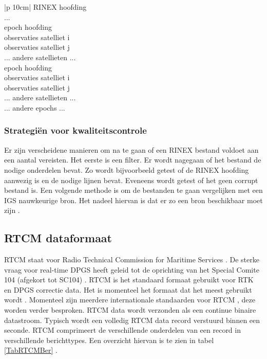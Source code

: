 \newcommand*{\MyIndent}{\hspace*{0.5cm}}%
 \begin{table}[hbp]
 	\caption{Vereenvoudigde samenstelling van een RINEX bestand}
 	\centering		
 	\begin{tabular}{|p {10cm}|}	
 		\hline
 		RINEX hoofding \\
 		... \\ \hline
 		epoch hoofding\\ \hline
 		\MyIndent observaties satelliet i \\ \hline
 		\MyIndent observaties satelliet j \\ \hline
 		... andere satellieten ... \\ \hline
 		epoch hoofding\\ \hline
 		\MyIndent observaties satelliet i \\ \hline
 		\MyIndent observaties satelliet j \\ \hline
 		... andere satellieten ... \\ \hline
 		... andere epochs ... \\ \hline	
 	\end{tabular}
 	\label{TabRINEX}
 \end{table}
 
 
\subsubsection{Strategi\"en voor kwaliteitscontrole}
Er zijn verscheidene manieren om na te gaan of een RINEX bestand voldoet aan een aantal vereisten. Het eerste is een filter. Er wordt nagegaan of het bestand de nodige onderdelen bevat. Zo wordt bijvoorbeeld getest of de RINEX hoofding aanwezig is en de nodige lijnen bevat. Eveneens wordt getest of het geen corrupt bestand is. Een volgende methode is om de bestanden te gaan vergelijken met een IGS nauwkeurige bron. Het nadeel hiervan is dat er zo een bron beschikbaar moet zijn \cite{LBibRINEX3}. 

\subsection{RTCM dataformaat}
\label{LRTC}
RTCM staat voor Radio Technical Commission for Maritime Services \cite{LBibGLONASS}. De sterke vraag voor real-time DPGS heeft geleid tot de oprichting van het Special Comite 104 (afgekort tot SC104) \cite{LBibRTCM}. RTCM is het standaard formaat gebruikt voor RTK en DPGS correctie data. Het is momenteel het formaat dat het meest gebruikt wordt \cite{LBibRTK3}. Momenteel zijn meerdere internationale standaarden voor RTCM \cite{LBibRTCM}, deze worden verder besproken. RTCM data wordt verzonden als een continue binaire datastroom. Typisch wordt een volledig RTCM data record verstuurd binnen een seconde. RTCM comprimeert de verschillende onderdelen van een record in verschillende berichttypes. Een overzicht hiervan is te zien in tabel \ref{TabRTCMBer} \cite{LBibRTCM3}.

